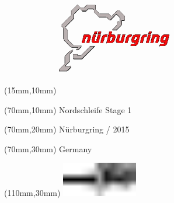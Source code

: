 \null\newpage
\begin{textblock*}{50mm}(15mm,10mm)%
\includegraphics[width=50mm]{LG/NUR.png}
\end{textblock*}
\begin{textblock*}{130mm}(70mm,10mm)%
{\fontsize{20}{20}\selectfont Nordschleife Stage 1}\\
\end{textblock*}
\begin{textblock*}{120mm}(70mm,20mm)%
{\fontsize{16}{16}\selectfont Nürburgring / 2015}\\
\end{textblock*}
\begin{textblock*}{120mm}(70mm,30mm)%
{\fontsize{12}{12}\selectfont Germany}
\end{textblock*}
\begin{textblock*}{30mm}(110mm,30mm)%
\centering
\includegraphics[height=15mm]{icons/tofinish.pdf}
\end{textblock*}
